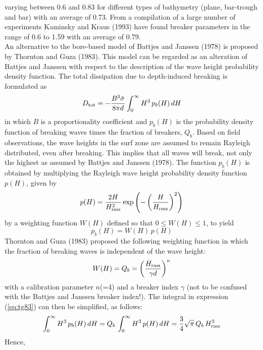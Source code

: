 \documentclass[12pt]{book}
\begin{document}
varying between 0.6 and 0.83 for different types of bathymetry (plane, bar-trough and bar) with an average
of 0.73. From a compilation of a large number of experiments Kaminsky and Kraus (1993) have found
breaker parameters in the range of 0.6 to 1.59 with an average of 0.79.
\nocite{Arc90L,Kam93K,Nel87,Nel94}
\\[2ex]
\noindent
An alternative to the bore-based model of Battjes and Janssen (1978) is proposed by Thornton and Guza (1983).
This model can be regarded as an alteration of Battjes and Janssen with respect to the description of the wave
height probability density function. The total dissipation due to depth-induced breaking is formulated as
\begin{equation}
  D_{\rm tot} = - \frac{B^3 \tilde{\sigma}}{8 \pi d} \int_{0}^{\infty} H^3 \, p_b(H)\,dH
  \label{eq:tg83}
\end{equation}
in which $B$ is a proportionality coefficient and $p_b(H)$ is the probability density function of breaking
waves times the fraction of breakers, $Q_b$. Based on field observations, the wave heights in the surf zone
are assumed to remain Rayleigh distributed, even after breaking. This implies that all waves will break, not
only the highest as assumed by Battjes and Janssen (1978). The function $p_b(H)$ is obtained by multiplying
the Rayleigh wave height probability density function $p(H)$, given by
\begin{equation}
  p(H) = \frac{2H}{H^2_{\rm rms}}\exp \left( - \left( \frac{H}{H_{\rm rms}} \right)^2 \right)
\end{equation}
by a weighting function $W(H)$ defined so that $0 \leq W(H) \leq 1$, to yield
\begin{equation}
  p_b(H) = W(H)\,p(H)
\end{equation}
Thornton and Guza (1983) proposed the following weighting function in which the fraction of breaking waves
is independent of the wave height:
\begin{equation}
  W(H) = Q_b = \left( \frac{H_{\rm rms}}{\gamma d} \right)^n
\end{equation}
with a calibration parameter $n$(=4) and a breaker index $\gamma$ (not to be confused with the Battjes and Janssen breaker index!).
The integral in expression (\ref{eq:tg83}) can then be simplified, as follows:
\begin{equation}
  \int_{0}^{\infty} H^3 \, p_b(H)\,dH = Q_b\,\int_{0}^{\infty} H^3 \, p(H)\,dH = \frac{3}{4}\sqrt{\pi}\,Q_b\,H^3_{\rm rms}
\end{equation}
Hence,
\end{document}
